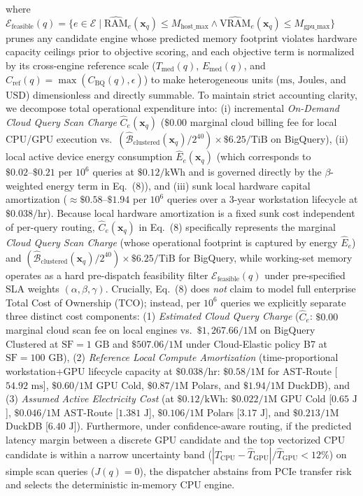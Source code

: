\documentclass[10pt,a4paper]{article}
\begin{document}
where $\mathcal{E}_{\text{feasible}}(q) = \{e \in \mathcal{E} \mid \widehat{\text{RAM}}_e(\mathbf{x}_q) \le M_{\text{host\_max}} \land \widehat{\text{VRAM}}_e(\mathbf{x}_q) \le M_{\text{gpu\_max}}\}$ prunes any candidate engine whose predicted memory footprint violates hardware capacity ceilings prior to objective scoring, and each objective term is normalized by its cross-engine reference scale ($T_{\text{med}}(q)$, $E_{\text{med}}(q)$, and $C_{\text{ref}}(q) = \max(C_{\text{BQ}}(q), \epsilon)$) to make heterogeneous units ($\text{ms}$, $\text{Joules}$, and $\text{USD}$) dimensionless and directly summable. To maintain strict accounting clarity, we decompose total operational expenditure into: (i) incremental \emph{On-Demand Cloud Query Scan Charge} $\hat{C}_e(\mathbf{x}_q)$ ($\$0.00$ marginal cloud billing fee for local CPU/GPU execution vs.\ $(\hat{\mathcal{B}}_{\text{clustered}}(\mathbf{x}_q)/2^{40})\times\$6.25/\text{TiB}$ on BigQuery), (ii) local active device energy consumption $\hat{E}_e(\mathbf{x}_q)$ (which corresponds to $\$0.02\text{--}\$0.21$ per $10^6$ queries at $\$0.12/\text{kWh}$ and is governed directly by the $\beta$-weighted energy term in Eq.~(8)), and (iii) sunk local hardware capital amortization ($\approx\$0.58\text{--}\$1.94$ per $10^6$ queries over a 3-year workstation lifecycle at $\$0.038/\text{hr}$). Because local hardware amortization is a fixed sunk cost independent of per-query routing, $\hat{C}_e(\mathbf{x}_q)$ in Eq.~(8) specifically represents the marginal \emph{Cloud Query Scan Charge} (whose operational footprint is captured by energy $\hat{E}_e$) and $(\hat{\mathcal{B}}_{\text{clustered}}(\mathbf{x}_q)/2^{40})\times \$6.25\text{/TiB}$ for BigQuery, while working-set memory operates as a hard pre-dispatch feasibility filter $\mathcal{E}_{\text{feasible}}(q)$ under pre-specified SLA weights $(\alpha,\beta,\gamma)$. Crucially, Eq.~(8) does \emph{not} claim to model full enterprise Total Cost of Ownership (TCO); instead, per $10^6$ queries we explicitly separate three distinct cost components: (1) \emph{Estimated Cloud Query Charge} ($\hat{C}_e$: $\$0.00$ marginal cloud scan fee on local engines vs.\ $\$1{,}267.66/1\text{M}$ on BigQuery Clustered at $\text{SF}=1\text{ GB}$ and $\$507.06/1\text{M}$ under Cloud-Elastic policy B7 at $\text{SF}=100\text{ GB}$), (2) \emph{Reference Local Compute Amortization} (time-proportional workstation+GPU lifecycle capacity at $\$0.038/\text{hr}$: $\$0.58/1\text{M}$ for AST-Route [$54.92\text{ ms}$], $\$0.60/1\text{M}$ GPU Cold, $\$0.87/1\text{M}$ Polars, and $\$1.94/1\text{M}$ DuckDB), and (3) \emph{Assumed Active Electricity Cost} (at $\$0.12/\text{kWh}$: $\$0.022/1\text{M}$ GPU Cold [$0.65\text{ J}$], $\$0.046/1\text{M}$ AST-Route [$1.381\text{ J}$], $\$0.106/1\text{M}$ Polars [$3.17\text{ J}$], and $\$0.213/1\text{M}$ DuckDB [$6.40\text{ J}$]). Furthermore, under confidence-aware routing, if the predicted latency margin between a discrete GPU candidate and the top vectorized CPU candidate is within a narrow uncertainty band ($|\hat{T}_{\text{CPU}} - \hat{T}_{\text{GPU}}|/\hat{T}_{\text{GPU}} < 12\%$) on simple scan queries ($J(q)=0$), the dispatcher abstains from PCIe transfer risk and selects the deterministic in-memory CPU engine.
\end{document}

